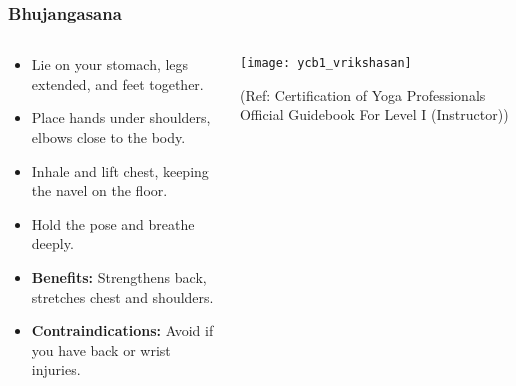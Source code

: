 \begin{frame}[fragile]\frametitle{Bhujangasana}
\begin{columns}
    \begin{column}[T]{0.5\linewidth}
      \begin{itemize}
        \item Lie on your stomach, legs extended, and feet together.
        \item Place hands under shoulders, elbows close to the body.
        \item Inhale and lift chest, keeping the navel on the floor.
        \item Hold the pose and breathe deeply.
        \item \textbf{Benefits:} Strengthens back, stretches chest and shoulders.
        \item \textbf{Contraindications:} Avoid if you have back or wrist injuries.
      \end{itemize}
    \end{column}
    \begin{column}[T]{0.5\linewidth}
        \begin{center}
        \begin{center}
		        \texttt{[image: ycb1\_vrikshasan]}
				
				{\tiny (Ref: Certification  of Yoga Professionals Official Guidebook For Level I (Instructor))}	        
		\end{center}   
        \end{center}    
    \end{column}
  \end{columns}
\end{frame}

